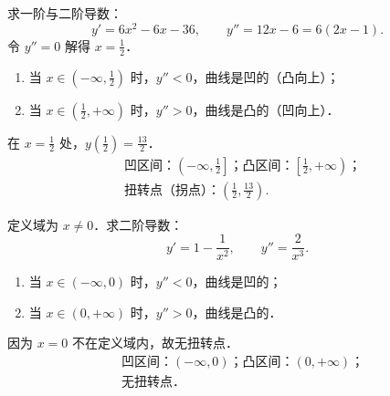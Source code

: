 \begin{solution}

    求一阶与二阶导数：
    \begin{equation}
        y' = 6x^2 - 6x - 36, \qquad y'' = 12x - 6 = 6(2x - 1).
    \end{equation}
    令 $y'' = 0$ 解得 $x = \frac{1}{2}$．
    \begin{enumerate}
        \item 当 $x \in \left(-\infty, \frac{1}{2}\right)$ 时，$y'' < 0$，曲线是凹的（凸向上）；
        \item 当 $x \in \left(\frac{1}{2}, +\infty\right)$ 时，$y'' > 0$，曲线是凸的（凹向上）．
    \end{enumerate}
    在 $x = \frac{1}{2}$ 处，$y\left(\frac{1}{2}\right) = \frac{13}{2}$．
    \begin{equation}
        \boxed{
        \begin{aligned}
             & \text{凹区间：} \left(-\infty, \frac{1}{2}\right]\text{；凸区间：} \left[\frac{1}{2}, +\infty\right)\text{；} \\
             & \text{扭转点（拐点）：} \left(\frac{1}{2}, \frac{13}{2}\right).
        \end{aligned}
        }
    \end{equation}


    定义域为 $x \neq 0$．求二阶导数：
    \begin{equation}
        y' = 1 - \frac{1}{x^2}, \qquad y'' = \frac{2}{x^3}.
    \end{equation}
    \begin{enumerate}
        \item 当 $x \in (-\infty, 0)$ 时，$y'' < 0$，曲线是凹的；
        \item 当 $x \in (0, +\infty)$ 时，$y'' > 0$，曲线是凸的．
    \end{enumerate}
    因为 $x = 0$ 不在定义域内，故无扭转点．
    \begin{equation}
        \boxed{
            \begin{aligned}
                 & \text{凹区间：} (-\infty, 0)\text{；凸区间：} (0, +\infty)\text{；} \\
                 & \text{无扭转点．}
            \end{aligned}
        }
    \end{equation}



\end{solution}
